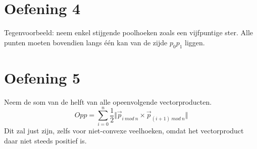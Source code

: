 \documentclass[10pt,a4paper]{article}
\begin{document}
\section*{Oefening 4}
Tegenvoorbeeld: neem enkel stijgende poolhoeken zoals een vijfpuntige ster. Alle punten moeten bovendien langs \'e\'en kan van de zijde $p_0p_1$ liggen.

\section*{Oefening 5}
Neem de som van de helft van alle opeenvolgende vectorproducten.
\[
Opp = \sum_{i=0}^{n}\frac{1}{2}\Vert\vec{p}_{i\ mod\ n}\times\vec{p}_{(i+1)\ mod\ n}\Vert
\]
Dit zal just zijn, zelfs voor niet-convexe veelhoeken, omdat het vectorproduct daar niet steeds positief is.



\end{document}
